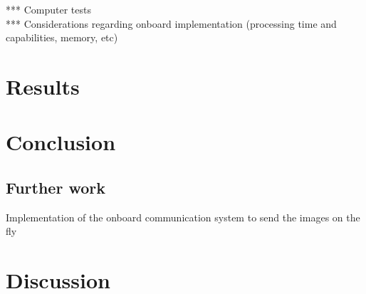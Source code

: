 *** Computer tests\\
*** Considerations regarding onboard implementation (processing time and capabilities, memory, etc)\\
\section{Results}
\section{Conclusion}
\subsection{Further work}
Implementation of the onboard communication system to send the images on the fly
\section{Discussion}
\newpage